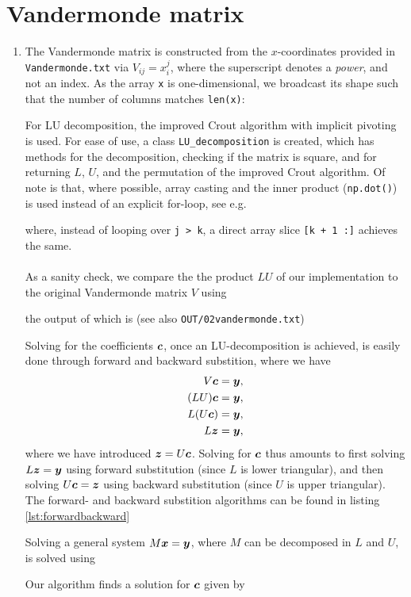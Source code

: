 \section{Vandermonde matrix}
\begin{enumerate}[label=(\alph*)]
    \item The Vandermonde matrix is constructed from the $x$-coordinates provided in \texttt{Vandermonde.txt} via $V_{ij} = x_i^j$, where the superscript denotes a \textit{power}, and not an index. As the array \verb|x| is one-dimensional, we broadcast its shape such that the number of columns matches \verb|len(x)|:

For LU decomposition, the improved Crout algorithm with implicit pivoting is used. For ease of use, a class \verb|LU_decomposition| is created, which has methods for the decomposition, checking if the matrix is square, and for returning $L$, $U$, and the permutation of the improved Crout algorithm. Of note is that, where possible, array casting and the inner product (\verb|np.dot()|) is used instead of an explicit for-loop, see e.g.

where, instead of looping over \verb|j > k|, a direct array slice \verb|[k + 1 :]| achieves the same.\\
\\
As a sanity check, we compare the the product $LU$ of our implementation to the original Vandermonde matrix $V$ using

the output of which is (see also \texttt{OUT/02vandermonde.txt})

Solving for the coefficients $\boldsymbol{c}$, once an LU-decomposition is achieved, is easily done through forward and backward substition, where we have
\begin{align}
    V\boldsymbol{c} &= \boldsymbol{y},\\
    (LU)\boldsymbol{c} &= \boldsymbol{y},\\
    L(U\boldsymbol{c}) &= \boldsymbol{y},\\
    L\boldsymbol{z} &= \boldsymbol{y},
\end{align}
where we have introduced $\boldsymbol{z} = U\boldsymbol{c}$. Solving for $\boldsymbol{c}$ thus amounts to first solving $L\boldsymbol{z} = \boldsymbol{y}$ using forward substitution (since $L$ is lower triangular), and then solving $U\boldsymbol{c} = \boldsymbol{z}$ using backward substitution (since $U$ is upper triangular). The forward- and backward substition algorithms can be found in listing \ref{lst:forwardbackward}

Solving a general system $M\boldsymbol{x} = \boldsymbol{y}$, where $M$ can be decomposed in $L$ and $U$, is solved using

Our algorithm finds a solution for $\boldsymbol{c}$ given by



\end{enumerate}
